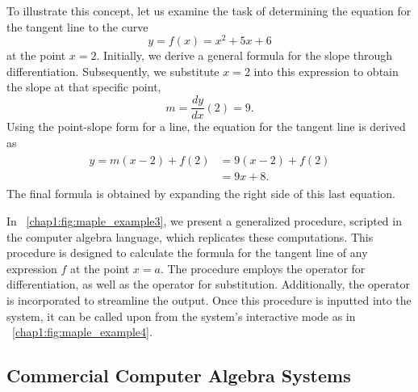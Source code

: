 To illustrate this concept, let us examine the task of determining the equation for the tangent line to the curve
%
\begin{equation*}
  y = f(x) = x^2 + 5x + 6
\end{equation*}
%
at the point $x = 2$. Initially, we derive a general formula for the slope through differentiation. Subsequently, we substitute $x = 2$ into this expression to obtain the slope at that specific point,
%
\begin{equation*}
  m = \dfrac{dy}{dx}(2) = 9.
\end{equation*}
%
Using the point-slope form for a line, the equation for the tangent line is derived as
%
\begin{equation*}
  \begin{aligned}
    \begin{split}
      y = m(x - 2) + f(2) &= 9(x - 2) + f(2) \\
      &= 9x + 8.
    \end{split}
  \end{aligned}
\end{equation*}
%
The final formula is obtained by expanding the right side of this last equation.

In \figurename~\ref{chap1:fig:maple_example3}, we present a generalized procedure, scripted in the \Maple{} computer algebra language, which replicates these computations. This procedure is designed to calculate the formula for the tangent line of any expression $f$ at the point $x = a$. The procedure employs the operator  for differentiation, as well as the operator  for substitution. Additionally, the  operator is incorporated to streamline the output. Once this procedure is inputted into the \Maple{} system, it can be called upon from the system's interactive mode as in \figurename~\ref{chap1:fig:maple_example4}.

\subsection{Commercial Computer Algebra Systems}


